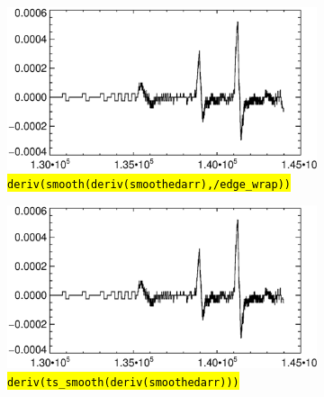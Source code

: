 \documentclass[10pt]{scrartcl}
\begin{document}
\begin{figure}[!h]
\begin{center}
   \begin{subfigure}[b]{.49\textwidth}
        \centering
        \includegraphics[width=1.\textwidth]{../plots_tables_images/justsmooth.eps}
        \caption{\hl{\texttt{deriv(smooth(deriv(smoothedarr),/edge\_wrap))}}}
    \end{subfigure}
    \begin{subfigure}[b]{.49\textwidth}
        \centering
        \includegraphics[width=1.\textwidth]{../plots_tables_images/doubletssmooth.eps}
        \caption{\hl{\texttt{deriv(ts\_smooth(deriv(smoothedarr)))}}}
    \end{subfigure}
    \caption{}
    \label{smoothtest}


\end{center}
\end{figure}
\end{document}
